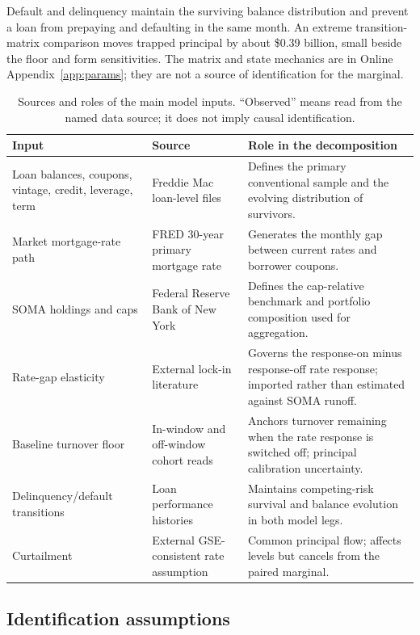 Default and delinquency maintain the surviving balance distribution and prevent a loan from prepaying and defaulting in the same month. An extreme transition-matrix comparison moves trapped principal by about \$0.39 billion, small beside the floor and form sensitivities. The matrix and state mechanics are in Online Appendix~\ref{app:params}; they are not a source of identification for the marginal.

\begin{table}[H]
\centering
\small
\caption{Sources and roles of the main model inputs. ``Observed'' means read from the named data source; it does not imply causal identification.}
\label{tab:inputs}\label{tab:estimators}\label{tab:specbox}
\begin{tabular}{@{}p{4.0cm}p{4.0cm}p{6.5cm}@{}}
\toprule
Input & Source & Role in the decomposition \\
\midrule
Loan balances, coupons, vintage, credit, leverage, term & Freddie Mac loan-level files & Defines the primary conventional sample and the evolving distribution of survivors. \\
Market mortgage-rate path & FRED 30-year primary mortgage rate & Generates the monthly gap between current rates and borrower coupons. \\
SOMA holdings and caps & Federal Reserve Bank of New York & Defines the cap-relative benchmark and portfolio composition used for aggregation. \\
Rate-gap elasticity & External lock-in literature & Governs the response-on minus response-off rate response; imported rather than estimated against SOMA runoff. \\
Baseline turnover floor & In-window and off-window cohort reads & Anchors turnover remaining when the rate response is switched off; principal calibration uncertainty. \\
Delinquency/default transitions & Loan performance histories & Maintains competing-risk survival and balance evolution in both model legs. \\
Curtailment & External GSE-consistent rate assumption & Common principal flow; affects levels but cancels from the paired marginal. \\
\bottomrule
\end{tabular}
\end{table}

\subsection{Identification assumptions}

